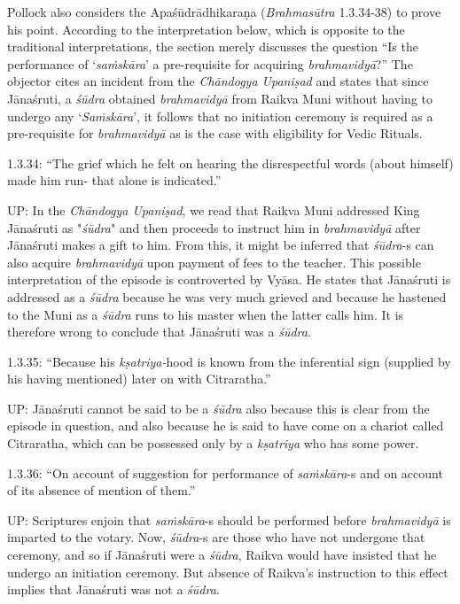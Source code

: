 Pollock also considers the Apaśūdrādhikaraṇa (\textit{Brahmasūtra} 1.3.34-38) to prove his point. According to the interpretation below, which is opposite to the traditional interpretations, the section merely discusses the question “Is the performance of ‘\textit{saṁskāra}’ a pre-requisite for acquiring \textit{brahmavidyā}?” The objector cites an incident from the \textit{Chāndogya Upaniṣad} and states that since Jānaśruti, a \textit{śūdra} obtained \textit{brahmavidyā} from Raikva Muni without having to undergo any `\textit{Saṁskāra}', it follows that no initiation ceremony is required as a pre-requisite for \textit{brahmavidyā} as is the case with eligibility for Vedic Rituals.

1.3.34: “The grief which he felt on hearing the disrespectful words (about himself) made him run- that alone is indicated.”

UP: In the \textit{Chāndogya Upaniṣad}, we read that Raikva Muni addressed King Jānaśruti as "\textit{śūdra}" and then proceeds to instruct him in \textit{brahmavidyā} after Jānaśruti makes a gift to him. From this, it might be inferred that \textit{śūdra}-s can also acquire \textit{brahmavidyā} upon payment of fees to the teacher. This possible interpretation of the episode is controverted by Vyāsa. He states that Jānaśruti is addressed as a \textit{śūdra} because he was very much grieved and because he hastened to the Muni as a \textit{śūdra} runs to his master when the latter calls him. It is therefore wrong to conclude that Jānaśruti was a \textit{śūdra}.

1.3.35: “Because his \textit{kṣatriya-}hood is known from the inferential sign (supplied by his having mentioned) later on with Citraratha.”

UP: Jānaśruti cannot be said to be a \textit{śūdra} also because this is clear from the episode in question, and also because he is said to have come on a chariot called Citraratha, which can be possessed only by a \textit{kṣatriya} who has some power.

1.3.36: “On account of suggestion for performance of \textit{saṁskāra}-s and on account of its absence of mention of them.”

UP: Scriptures enjoin that \textit{saṁskāra}-s should be performed before \textit{brahmavidyā} is imparted to the votary. Now, \textit{śūdra}-s are those who have not undergone that ceremony, and so if Jānaśruti were a \textit{śūdra}, Raikva would have insisted that he undergo an initiation ceremony. But absence of Raikva's instruction to this effect implies that Jānaśruti was not a \textit{śūdra}.


